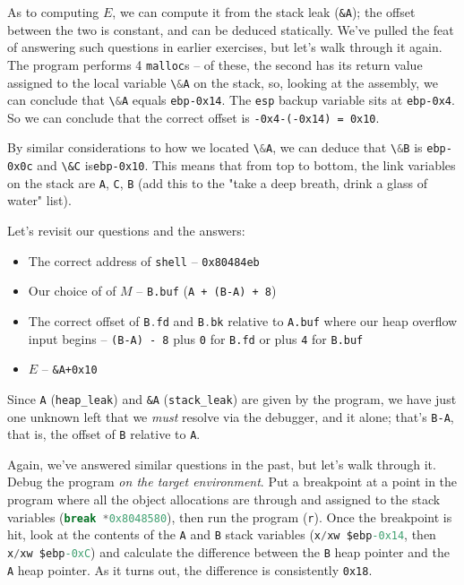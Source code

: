 \documentclass{article}
\newcommand{\xcode}[2]{\colorbox{ubuntuback}{\lstinline[language=#1]|#2|}}
\newcommand{\asm}[1]{\xcode{{[x86masm]assembler}}{#1}}
\newcommand{\code}[1]{\colorbox{ubuntuback}{\texttt{#1}}}
\newcommand{\gdb}[1]{\xcode{C}{#1}}
\begin{document}
As to computing $E$, we can compute it from the stack leak (\code{\&A}); the offset between the two is constant, and can be deduced statically. We've pulled the feat of answering such questions in earlier exercises, but let's walk through it again. The program performs 4 \xcode{C}{malloc}s -- of these, the second has its return value assigned to the local variable \xcode{C}{\&A} on the stack, so, looking at the assembly, we can conclude that \xcode{C}{\&A} equals \asm{ebp-0x14}. The \asm{esp} backup variable sits at \asm{ebp-0x4}. So we can conclude that the correct offset is \code{-0x4-(-0x14) = 0x10}.

By similar considerations to how we located \xcode{C}{\&A}, we can deduce that \xcode{C}{\&B} is \asm{ebp-0x0c} and \asm{\&C} is\asm{ebp-0x10}. This means that from top to bottom, the link variables on the stack are \xcode{C}{A}, \xcode{C}{C}, \xcode{C}{B} (add this to the "take a deep breath, drink a glass of water" list).

Let's revisit our questions and the answers:
\begin{itemize}
    \item The correct address of \xcode{C}{shell} -- \code{0x80484eb}
    \item Our choice of of $M$ -- \code{B.buf} (\code{A + (B-A) + 8})
    \item The correct offset of \xcode{C}{B.fd} and \xcode{C}{B.bk} relative to \code{A.buf} where our heap overflow input begins -- \code{(B-A) - 8} plus \code{0} for \code{B.fd} or plus \code{4} for \code{B.buf}
    \item $E$ -- \code{\&A+0x10}
\end{itemize}
        
Since \code{A} (\code{heap\_leak}) and \code{\&A} (\code{stack\_leak}) are given by the program, we have just one unknown left that we \textit{must} resolve via the debugger, and it alone; that's \code{B-A}, that is, the offset of \code{B} relative to \code{A}.

Again, we've answered similar questions in the past, but let's walk through it. Debug the program \textit{on the target environment}. Put a breakpoint at a point in the program where all the object allocations are through and assigned to the stack variables (\gdb{break *0x8048580}), then run the program (\gdb{r}). Once the breakpoint is hit, look at the contents of the \xcode{C}{A} and \xcode{C}{B} stack variables (\gdb{x/xw $ebp-0x14}, then \gdb{x/xw $ebp-0xC}) and calculate the difference between the \xcode{C}{B} heap pointer and the \xcode{C}{A} heap pointer. As it turns out, the difference is consistently \code{0x18}. 
\end{document}
